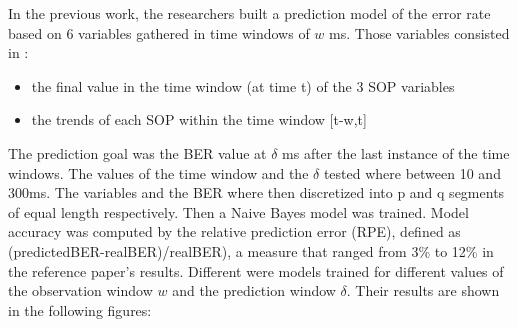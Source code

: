 \documentclass[a4paper]{article}
\begin{document}
In the previous work, the researchers built a prediction model of the error rate based on 6 variables gathered in time windows of $w$ ms. Those variables consisted in :
\begin{itemize}
    \item the final value in the time window (at time t) of the 3 SOP variables
    \item the trends of each SOP within the time window [t-w,t]
\end{itemize}

The prediction goal was the BER value at $\delta$ ms after the last instance of the time windows. The values of the time window and the $\delta$ tested where between 10 and 300ms.
The variables and the BER where then discretized into p and q segments of equal length respectively. Then a Naive Bayes model was trained. Model accuracy was computed by the relative prediction error (RPE), defined as (predictedBER-realBER)/realBER), a measure that ranged from 3\% to 12\% in the reference paper's results. Different were models trained for different values of the observation window $w$ and the prediction window $\delta$. Their results are shown in the following figures:
\end{document}
